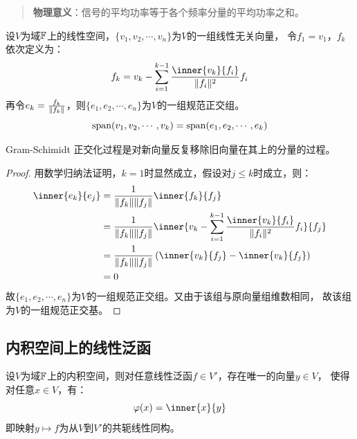 \begin{quote}
    \textbf{物理意义}：信号的平均功率等于各个频率分量的平均功率之和。
\end{quote}

\begin{theorem}
    设\(V\)为域\(\mathbb{F}\)上的线性空间，\(\{v_1, v_2, \cdots, v_n\}\)为\(V\)的一组线性无关向量，
    令\(f_{1}= v_{1}\)，\(f_{k}\) 依次定义为：
    \[
        f_k = v_k - \sum_{i=1}^{k-1} \frac{\inner{v_k}{f_i}}{\norm{f_i}^{2}} f_i
    \]
    再令\(e_k = \frac{f_k}{\lVert f_k\rVert}\)，则\(\{e_1, e_2, \cdots,
    e_n\}\)为\(V\)的一组规范正交组。
    \[
        \operatorname{span}(v_1, v_2, \cdots, v_k) = \operatorname{span}(e_1, e_2, \cdots, e_k)
    \]
\end{theorem}

Gram-Schimidt 正交化过程是对新向量反复移除旧向量在其上的分量的过程。

\begin{proof}
    用数学归纳法证明，\(k=1\)时显然成立，假设对\(j\leq k\)时成立，则：
    \begin{align*}
        \inner{e_{k}}{e_{j}} &= \frac{1}{\norm{f_k} \norm{f_j}}
        \inner{f_k}{f_j} \\
        &= \frac{1}{\norm{f_k} \norm{f_j}} \inner{v_k -
        \sum_{i=1}^{k-1} \frac{\inner{v_k}{f_i}}{\norm{f_i}^{2}} f_i}{f_j} \\
        &= \frac{1}{\norm{f_k} \norm{f_j}} \left(
        \inner{v_{k}}{f_{j}} - \inner{v_{k}}{f_{j}} \right) \\
        &= 0
    \end{align*}
    故\(\{e_1, e_2, \cdots, e_n\}\)为\(V\)的一组规范正交组。又由于该组与原向量组维数相同，
    故该组为\(V\)的一组规范正交基。
\end{proof}


\subsection{内积空间上的线性泛函}

\begin{theorem}[Rietz表示定理]
    设\(V\)为域\(\mathbb{F}\)上的内积空间，则对任意线性泛函\(f \in V'\)，存在唯一的向量\(y \in V\)，
    使得对任意\(x \in V\)，有：
    \[
        \varphi(x) = \inner{x}{y}
    \]
    即映射\(y \mapsto f\)为从\(V\)到\(V'\)的共轭线性同构。
\end{theorem}

